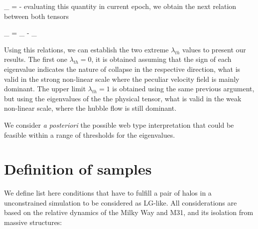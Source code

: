 \documentclass[usenatbib]{latex/mn2e}
\begin{document}
{
\Pi_{\alpha\beta} = -
}
evaluating this quantity in current epoch, we obtain the next relation 
between both tensors


{ \Pi_{\alpha\beta} = \Sigma_{\alpha\beta} - \delta_{\alpha\beta} }


Using this relations, we can establish the two extreme $\lambda_{th}$ 
values to present our results. The first one $\lambda_{th} = 0$, it is 
obtained assuming that the sign of each eigenvalue indicates the nature of
collapse in the respective direction, what is valid in the strong 
non-linear scale where the peculiar velocity field is mainly dominant. 
The upper limit $\lambda_{th} = 1$ is obtained using the same previous 
argument, but using the eigenvalues of the the physical tensor, what is 
valid in the weak non-linear scale, where the hubble flow is still 
dominant.


We consider \textit{a posteriori} the possible web type interpretation 
that could be feasible within a range of thresholds for the eigenvalues. 


\section{Definition of samples}
\label{section:Def_Samples}


We define list here conditions that have to fulfill a pair of halos in a 
unconstrained simulation to be considered as LG-like. All considerations 
are based on the relative dynamics of the Milky Way and M31, and its 
isolation from massive structures:
\end{document}
